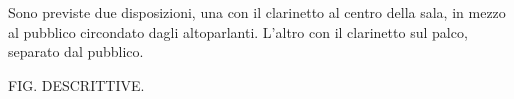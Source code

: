 Sono previste due disposizioni, una con il clarinetto al centro della sala, in mezzo al pubblico circondato dagli altoparlanti. L'altro con il clarinetto sul palco, separato dal pubblico. 

FIG. DESCRITTIVE.

%
%
%
%
%
